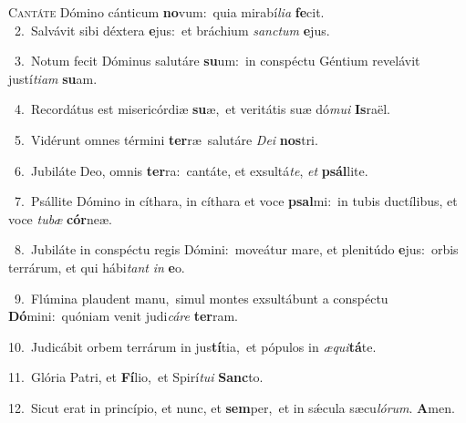 \lettrine{\initial\textcolor{\initialcolor}{C}}{antáte} Dómino cánticum \textbf{no}\-vum:~\star quia mirabí\-\textit{li}\-\textit{a} \textbf{fe}\-cit.\\
{\numbfont\textcolor{\numbcolor}{~2.}}~Salvávit sibi déxtera \textbf{e}\-jus:~\star et bráchium \textit{sanc}\-\textit{tum} \textbf{e}\-jus.\par
{\numbfont\textcolor{\numbcolor}{~3.}}~Notum fecit Dóminus salutáre \textbf{su}\-um:~\star in conspéctu Géntium revelávit justí\-\textit{ti}\-\textit{am} \textbf{su}\-am.\par
{\numbfont\textcolor{\numbcolor}{~4.}}~Recordátus est misericórdiæ \textbf{su}\-æ,~\star et veritátis suæ dó\-\textit{mu}\-\textit{i} \textbf{Is}\-raël.\par
{\numbfont\textcolor{\numbcolor}{~5.}}~Vidérunt omnes términi \textbf{ter}\-ræ~\star salutáre \textit{De}\-\textit{i} \textbf{nos}\-tri.\par
{\numbfont\textcolor{\numbcolor}{~6.}}~Jubiláte Deo, omnis \textbf{ter}\-ra:~\star cantáte, et exsultá\-\textit{te}\-, \textit{et} \textbf{psál}\-lite.\par
{\numbfont\textcolor{\numbcolor}{~7.}}~Psállite Dómino in cíthara, in cíthara et voce \textbf{psal}\-mi:~\star in tubis ductílibus, et voce \textit{tu}\-\textit{bæ} \textbf{cór}\-neæ.\par
{\numbfont\textcolor{\numbcolor}{~8.}}~Jubiláte in conspéctu regis Dómini:~\dagger moveátur mare, et plenitúdo \textbf{e}\-jus:~\star orbis terrárum, et qui hábi\textit{tant} \textit{in} \textbf{e}\-o.\par
{\numbfont\textcolor{\numbcolor}{~9.}}~Flúmina plaudent manu,~\dagger simul montes exsultábunt a conspéctu \textbf{Dó}\-mini:~\star quóniam venit judi\-\textit{cá}\-\textit{re} \textbf{ter}\-ram.\par
{\numbfont\textcolor{\numbcolor}{10.}}~Judicábit orbem terrárum in jus\-\textbf{tí}\-tia,~\star et pópulos in \textit{æ}\-\textit{qui}\textbf{tá}te.\par
{\numbfont\textcolor{\numbcolor}{11.}}~Glória Patri, et \textbf{Fí}\-lio,~\star et Spirí\-\textit{tu}\-\textit{i} \textbf{Sanc}\-to.\par
{\numbfont\textcolor{\numbcolor}{12.}}~Sicut erat in princípio, et nunc, et \textbf{sem}\-per,~\star et in sǽcula sæcu\-\textit{ló}\-\textit{rum}. \textbf{A}\-men.\par
